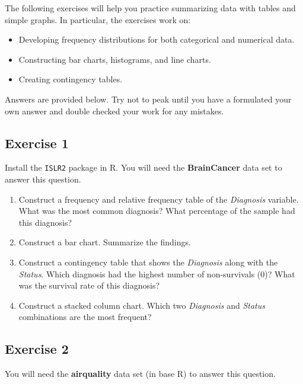 \documentclass[
  letterpaper,
  DIV=11,
  numbers=noendperiod]{scrreprt}
\providecommand{\tightlist}{%
  \setlength{\itemsep}{0pt}\setlength{\parskip}{0pt}}\usepackage{longtable,booktabs,array}
\begin{document}
The following exercises will help you practice summarizing data with
tables and simple graphs. In particular, the exercises work on:

\begin{itemize}
\item
  Developing frequency distributions for both categorical and numerical
  data.
\item
  Constructing bar charts, histograms, and line charts.
\item
  Creating contingency tables.
\end{itemize}

Answers are provided below. Try not to peak until you have a formulated
your own answer and double checked your work for any mistakes.

\hypertarget{exercise-1-2}{%
\subsection*{Exercise 1}\label{exercise-1-2}}

Install the \texttt{ISLR2} package in R. You will need the
\textbf{BrainCancer} data set to answer this question.

\begin{enumerate}
\def\labelenumi{\arabic{enumi}.}
\tightlist
\item
  Construct a frequency and relative frequency table of the
  \emph{Diagnosis} variable. What was the most common diagnosis? What
  percentage of the sample had this diagnosis?
\item
  Construct a bar chart. Summarize the findings.
\item
  Construct a contingency table that shows the \emph{Diagnosis} along
  with the \emph{Status}. Which diagnosis had the highest number of
  non-survivals (0)? What was the survival rate of this diagnosis?
\item
  Construct a stacked column chart. Which two \emph{Diagnosis} and
  \emph{Status} combinations are the most frequent?
\end{enumerate}

\hypertarget{exercise-2-2}{%
\subsection*{Exercise 2}\label{exercise-2-2}}

You will need the \textbf{airquality} data set (in base R) to answer
this question.
\end{document}
